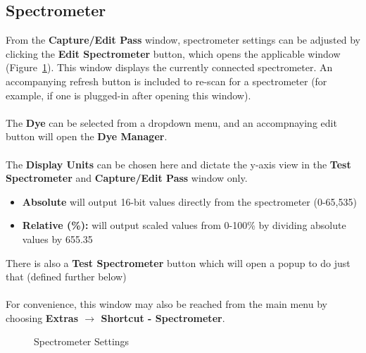 \documentclass[10pt,letterpaper,titlepage]{article}
\begin{document}
    \subsection{Spectrometer}
    From the \textbf{Capture/Edit Pass} window, spectrometer settings can be adjusted by clicking the \textbf{Edit Spectrometer} button, which opens the applicable window (Figure~\ref{fig:spectrometer_settings}). This window displays the currently connected spectrometer. An accompanying refresh button is included to re-scan for a spectrometer (for example, if one is plugged-in after opening this window).\\\\
    The \textbf{Dye} can be selected from a dropdown menu, and an accompnaying edit button will open the \textbf{Dye Manager}.\\\\
    The \textbf{Display Units} can be chosen here and dictate the y-axis view in the \textbf{Test Spectrometer} and \textbf{Capture/Edit Pass} window only. 
    \begin{itemize}
        \item \textbf{Absolute} will output 16-bit values directly from the spectrometer (0-65,535)
        \item \textbf{Relative (\%):} will output scaled values from 0-100\% by dividing absolute values by 655.35
    \end{itemize}
    There is also a \textbf{Test Spectrometer} button which will open a popup to do just that (defined further below)
    \\\\
    For convenience, this window may also be reached from the main menu by choosing \textbf{Extras $\rightarrow$ Shortcut - Spectrometer}.

    \begin{figure}[hb]
        \centering
        \caption{Spectrometer Settings}
        \label{fig:spectrometer_settings}
    \end{figure}
    \FloatBarrier
    \newpage
\end{document}
